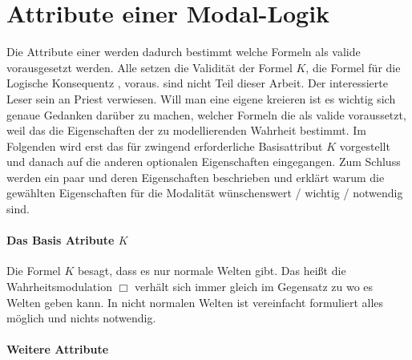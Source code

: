 

\section{Attribute einer Modal-Logik} %
\label{sub:attribute_einer_modal_logik}
Die Attribute einer \ML werden dadurch bestimmt welche Formeln als valide vorausgesetzt werden.
Alle \NML setzen die Validität der Formel $K$, die Formel für die Logische Konsequentz , voraus.
\NNML sind nicht Teil dieser Arbeit. Der interessierte Leser sein an Priest \cite[S.75ff]{Priest:2008} verwiesen.
Will man eine eigene \ML kreieren ist es wichtig sich genaue Gedanken darüber zu machen, welcher Formeln die als valide voraussetzt, weil das die Eigenschaften der zu modellierenden Wahrheit bestimmt.
Im Folgenden wird erst das für \NML zwingend erforderliche Basisattribut $K$ vorgestellt und danach auf die anderen optionalen Eigenschaften eingegangen.
Zum Schluss werden ein paar \NML und deren Eigenschaften beschrieben und erklärt warum die gewählten Eigenschaften für die Modalität wünschenswert / wichtig / notwendig sind.\\
%
\paragraph{Das Basis Atribute $K$} %
\label{par:das_basis_atribute_k_} Die Formel $K$ \KFormel besagt, dass es nur normale Welten gibt. Das heißt die Wahrheitsmodulation $\Box$ verhält sich immer gleich im Gegensatz zu \NNML wo es  Welten geben kann.
In nicht normalen Welten ist vereinfacht formuliert alles möglich und nichts notwendig.\cite[S.75]{Priest:2008}


\paragraph{Weitere Attribute} %
\label{par:weitere_attribute} 

